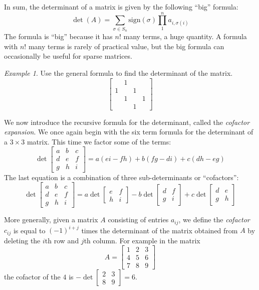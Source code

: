 \documentclass[11pt,oneside]{amsbook}
\theoremstyle{definition}
\theoremstyle{plain}
\theoremstyle{definition}
\theoremstyle{remark}
\newtheorem{example}[theorem]{Example}
\numberwithin{equation}{section}
\numberwithin{figure}{section}
\begin{document}
In sum, the determinant of a matrix is given by the following ``big'' formula:
\[\det(A)=
  \sum_{\sigma\in S_n}\mathrm{sign}(\sigma)\prod_1^na_{i,\sigma(i)}
\]
The formula is ``big'' because it has $n!$ many terms, a huge quantity. A formula with $n!$ many terms is rarely of practical value, but the big formula can occasionally be useful for sparse matrices.

\begin{example}
  Use the general formula to find the determinant of the matrix.
  \[\begin{bmatrix}&1&&\\1&&1\\&1&&1\\&&1\end{bmatrix}
  \]
\end{example}

We now introduce the recursive formula for the determinant, called the \emph{cofactor expansion}. We once again begin with the six term formula for the determinant of a $3\times3$ matrix. This time we factor some of the terms:
\[\det\begin{bmatrix}a&b&c\\d&e&f\\g&h&i\end{bmatrix}
  =a(ei-fh)+b(fg-di)+c(dh-eg)
\]
The last equation is a combination of three sub-determinants or ``cofactors'':
\[\det\begin{bmatrix}a&b&c\\d&e&f\\g&h&i\end{bmatrix}
  =a\det\begin{bmatrix}e&f\\h&i\end{bmatrix}
  -b\det\begin{bmatrix}d&f\\g&i\end{bmatrix}
  +c\det\begin{bmatrix}d&e\\g&h\end{bmatrix}
\]

More generally, given a matrix $A$ consisting of entries $a_{ij}$, we define the \emph{cofactor} $c_{ij}$ is equal to $(-1)^{i+j}$ times the determinant of the matrix obtained from $A$ by deleting the $i$th row and $j$th column. For example in the matrix
\[A=\begin{bmatrix}1&2&3\\4&5&6\\7&8&9\end{bmatrix}
\]
the cofactor of the $4$ is $-\det\begin{bmatrix}2&3\\8&9\end{bmatrix}=6$.
\end{document}
